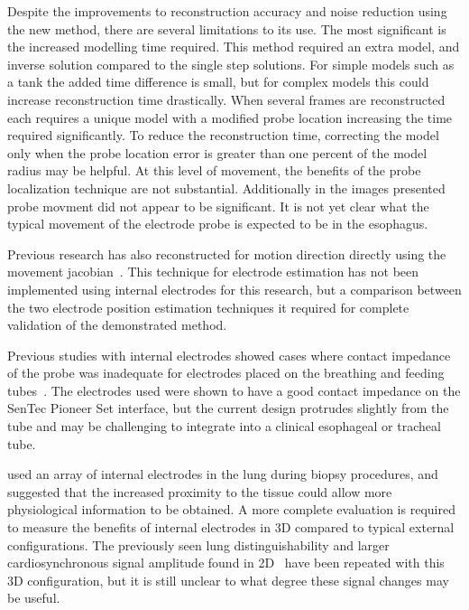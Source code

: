 Despite the improvements to reconstruction accuracy 
and noise reduction using the new method, there are several limitations to its use. The most significant is 
the increased modelling time required. This method required an extra model, and inverse 
solution compared to the single step solutions. For simple models such as 
a tank the added time difference
is small, but for complex models this could increase reconstruction time drastically. 
When several frames are reconstructed each requires a unique model 
with a modified probe location increasing the time required significantly. 
To reduce the reconstruction 
time, correcting the model only when the  probe location error is greater than one 
percent of the model radius may be helpful. At this 
level of movement, the benefits of 
the probe localization technique are 
not substantial. 
Additionally in the images presented probe movment did not 
appear to be significant. It is not yet clear what the typical movement of the electrode probe 
is expected to be in the esophagus. 

Previous research has also 
reconstructed for motion direction directly using the movement
jacobian~\parencite{boyle_geophysical_2016,gomez-laberge_direct_2008,soleimani_imaging_2006}.
This technique for electrode estimation has not been implemented using internal electrodes 
for this research, but a comparison between the two electrode position estimation techniques 
it required for complete validation of the demonstrated method.

Previous studies with internal electrodes showed cases where contact impedance of the probe
was inadequate for electrodes
placed on the breathing and feeding tubes~\parencite{czaplik_application_2014}.
The electrodes used were shown to have a good contact impedance on the SenTec Pioneer
Set interface, but the current design protrudes slightly from the tube and may be challenging to 
integrate into a clinical esophageal or tracheal tube.

 used an array of internal electrodes in the lung 
during biopsy procedures, and suggested that the increased proximity to the 
tissue could allow more physiological information to be obtained. A more complete 
evaluation is required to measure the benefits of internal electrodes in 3D compared 
to typical external configurations. The previously seen lung distinguishability
and larger cardiosynchronous signal amplitude found in 2D~\parencite{czaplik_application_2014} 
have been repeated with this 3D configuration, but it is still unclear to what 
degree these signal changes may be useful. 

